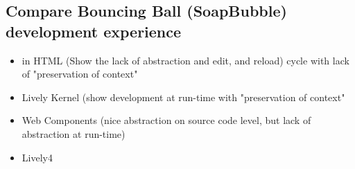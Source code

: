 \subsection{Compare Bouncing Ball (SoapBubble) development experience}

\begin{itemize}
  \item in HTML (Show the lack of abstraction and edit, and reload) cycle with lack of "preservation of context"
  \item Lively Kernel (show development at run-time with "preservation of context" 
  \item Web Components (nice abstraction on source code level, but lack of abstraction at run-time)
  \item Lively4
\end{itemize}
